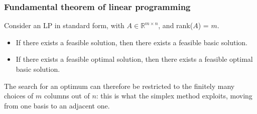 \documentclass[aspectratio=169]{beamer}
\providecommand{\red}{\color{red}}
\def\RR{\mathbb{R}}
\begin{document}
\begin{frame}
\begin{center}
\end{center}

\end{frame}

\begin{frame}
	\frametitle{Fundamental theorem of linear programming}

Consider an LP in standard form, with $A \in \RR^{m \times n}$, and rank($A$) = $m$.
	\begin{itemize}
		\item
		If there exists a feasible solution, then there exists a feasible basic solution.
		\item
		If there exists a feasible optimal solution, then there exists a feasible optimal basic solution.
	\end{itemize}

\mbox{}

The search for an optimum can therefore be restricted to the {\red finitely many} choices of $m$ columns out of $n$: this is what the simplex method exploits, moving from one basis to an adjacent one.

\end{frame}
\end{document}
